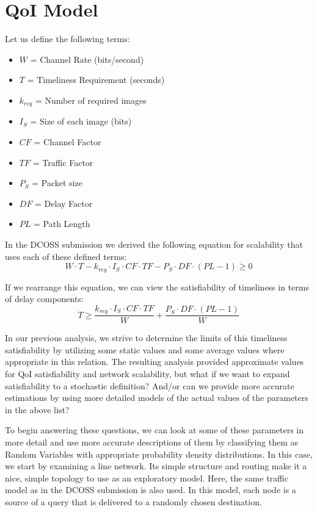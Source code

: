 \section{QoI Model}
\label{sec:qoi_model}

Let us define the following terms:

\begin{itemize}
  \item $W$ = Channel Rate (bits/second)
  \item $T$ = Timeliness Requirement (seconds)
  \item $k_{req}$ = Number of required images
  \item $I_S$ = Size of each image (bits)
  \item $CF$ = Channel Factor
  \item $TF$ = Traffic Factor
  \item $P_S$ = Packet size
  \item $DF$ = Delay Factor
  \item $PL$ = Path Length
\end{itemize}

In the DCOSS submission we derived the following equation for scalability that uses each of these defined terms:
\begin{equation}
	W \cdot T - k_{req} \cdot I_S \cdot CF \cdot TF - P_S \cdot DF \cdot (PL-1) \geq 0	
\end{equation}

If we rearrange this equation, we can view the satisfiability of timeliness in terms of delay components:
\begin{equation}
	T \geq \frac{ k_{req} \cdot I_S \cdot CF \cdot TF}{W} + \frac{P_S \cdot DF \cdot (PL-1)}{W}
\end{equation}

In our previous analysis, we strive to determine the limits of this timeliness satisfiability by utilizing some static values and some average values where appropriate in this relation.  The resulting analysis provided approximate values for QoI satisfiability and network scalability, but what if we want to expand satisfiability to a stochastic definition?  And/or can we provide more accurate estimations by using more detailed models of the actual values of the parameters in the above list? 

To begin answering these questions, we can look at some of these parameters in more detail and use more accurate descriptions of them by classifying them as Random Variables with appropriate probability density distributions.  In this case, we start by examining a line network.  Its simple structure and routing make it a nice, simple topology to use as an exploratory model.  Here, the same traffic model as in the DCOSS submission is also used.  In this model, each node is a source of a query that is delivered to a randomly chosen destination.  

